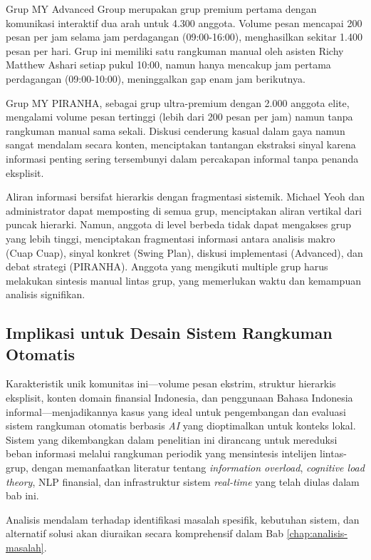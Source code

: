 Grup MY Advanced Group merupakan grup premium pertama dengan komunikasi interaktif dua arah untuk 4.300 anggota. Volume pesan mencapai 200 pesan per jam selama jam perdagangan (09:00-16:00), menghasilkan sekitar 1.400 pesan per hari. Grup ini memiliki satu rangkuman manual oleh asisten Richy Matthew Ashari setiap pukul 10:00, namun hanya mencakup jam pertama perdagangan (09:00-10:00), meninggalkan gap enam jam berikutnya.

Grup MY PIRANHA, sebagai grup ultra-premium dengan 2.000 anggota elite, mengalami volume pesan tertinggi (lebih dari 200 pesan per jam) namun tanpa rangkuman manual sama sekali. Diskusi cenderung kasual dalam gaya namun sangat mendalam secara konten, menciptakan tantangan ekstraksi sinyal karena informasi penting sering tersembunyi dalam percakapan informal tanpa penanda eksplisit.

Aliran informasi bersifat hierarkis dengan fragmentasi sistemik. Michael Yeoh dan administrator dapat memposting di semua grup, menciptakan aliran vertikal dari puncak hierarki. Namun, anggota di level berbeda tidak dapat mengakses grup yang lebih tinggi, menciptakan fragmentasi informasi antara analisis makro (Cuap Cuap), sinyal konkret (Swing Plan), diskusi implementasi (Advanced), dan debat strategi (PIRANHA). Anggota yang mengikuti multiple grup harus melakukan sintesis manual lintas grup, yang memerlukan waktu dan kemampuan analisis signifikan.

\subsection{Implikasi untuk Desain Sistem Rangkuman Otomatis}

Karakteristik unik komunitas ini—volume pesan ekstrim, struktur hierarkis eksplisit, konten domain finansial Indonesia, dan penggunaan Bahasa Indonesia informal—menjadikannya kasus yang ideal untuk pengembangan dan evaluasi sistem rangkuman otomatis berbasis \textit{AI} yang dioptimalkan untuk konteks lokal. Sistem yang dikembangkan dalam penelitian ini dirancang untuk mereduksi beban informasi melalui rangkuman periodik yang mensintesis intelijen lintas-grup, dengan memanfaatkan literatur tentang \textit{information overload}, \textit{cognitive load theory}, NLP finansial, dan infrastruktur sistem \textit{real-time} yang telah diulas dalam bab ini.

Analisis mendalam terhadap identifikasi masalah spesifik, kebutuhan sistem, dan alternatif solusi akan diuraikan secara komprehensif dalam Bab \ref{chap:analisis-masalah}.